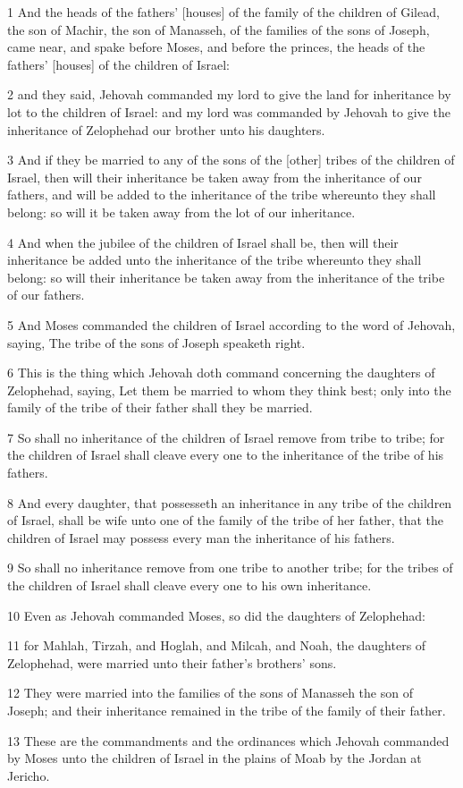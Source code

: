 \par 1 And the heads of the fathers' [houses] of the family of the children of Gilead, the son of Machir, the son of Manasseh, of the families of the sons of Joseph, came near, and spake before Moses, and before the princes, the heads of the fathers' [houses] of the children of Israel:
\par 2 and they said, Jehovah commanded my lord to give the land for inheritance by lot to the children of Israel: and my lord was commanded by Jehovah to give the inheritance of Zelophehad our brother unto his daughters.
\par 3 And if they be married to any of the sons of the [other] tribes of the children of Israel, then will their inheritance be taken away from the inheritance of our fathers, and will be added to the inheritance of the tribe whereunto they shall belong: so will it be taken away from the lot of our inheritance.
\par 4 And when the jubilee of the children of Israel shall be, then will their inheritance be added unto the inheritance of the tribe whereunto they shall belong: so will their inheritance be taken away from the inheritance of the tribe of our fathers.
\par 5 And Moses commanded the children of Israel according to the word of Jehovah, saying, The tribe of the sons of Joseph speaketh right.
\par 6 This is the thing which Jehovah doth command concerning the daughters of Zelophehad, saying, Let them be married to whom they think best; only into the family of the tribe of their father shall they be married.
\par 7 So shall no inheritance of the children of Israel remove from tribe to tribe; for the children of Israel shall cleave every one to the inheritance of the tribe of his fathers.
\par 8 And every daughter, that possesseth an inheritance in any tribe of the children of Israel, shall be wife unto one of the family of the tribe of her father, that the children of Israel may possess every man the inheritance of his fathers.
\par 9 So shall no inheritance remove from one tribe to another tribe; for the tribes of the children of Israel shall cleave every one to his own inheritance.
\par 10 Even as Jehovah commanded Moses, so did the daughters of Zelophehad:
\par 11 for Mahlah, Tirzah, and Hoglah, and Milcah, and Noah, the daughters of Zelophehad, were married unto their father's brothers' sons.
\par 12 They were married into the families of the sons of Manasseh the son of Joseph; and their inheritance remained in the tribe of the family of their father.
\par 13 These are the commandments and the ordinances which Jehovah commanded by Moses unto the children of Israel in the plains of Moab by the Jordan at Jericho.

